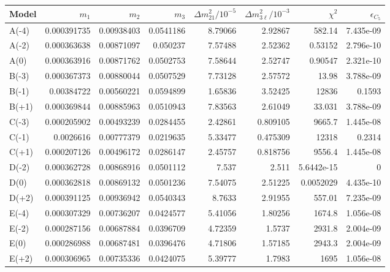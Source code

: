 \begin{tabular}{lrrrrrrr}
\hline
Model & $m_1$ & $m_2$ & $m_3$ & $\Delta m^2_{21}/10^{-5}$ & $\Delta m^2_{3\ell}/10^{-3}$ & $\chi^2$ & $\epsilon_{C_5}$ \\
\hline
A(-4) & 0.000391735 & 0.00938403 & 0.0541186 & 8.79066 & 2.92867 & 582.14 & 7.435e-09 \\
A(-2) & 0.000363638 & 0.00871097 & 0.050237 & 7.57488 & 2.52362 & 0.53152 & 2.796e-10 \\
A(0) & 0.000363916 & 0.00871762 & 0.0502753 & 7.58644 & 2.52747 & 0.90547 & 2.321e-10 \\
B(-3) & 0.000367373 & 0.00880044 & 0.0507529 & 7.73128 & 2.57572 & 13.98 & 3.788e-09 \\
B(-1) & 0.00384722 & 0.00560221 & 0.0594899 & 1.65836 & 3.52425 & 12836 & 0.1593 \\
B(+1) & 0.000369844 & 0.00885963 & 0.0510943 & 7.83563 & 2.61049 & 33.031 & 3.788e-09 \\
C(-3) & 0.000205902 & 0.00493239 & 0.0284455 & 2.42861 & 0.809105 & 9665.7 & 1.445e-08 \\
C(-1) & 0.0026616 & 0.00777379 & 0.0219635 & 5.33477 & 0.475309 & 12318 & 0.2314 \\
C(+1) & 0.000207126 & 0.00496172 & 0.0286147 & 2.45757 & 0.818756 & 9556.4 & 1.445e-08 \\
D(-2) & 0.000362728 & 0.00868916 & 0.0501112 & 7.537 & 2.511 & 5.6442e-15 & 0 \\
D(0) & 0.000362818 & 0.00869132 & 0.0501236 & 7.54075 & 2.51225 & 0.0052029 & 4.435e-10 \\
D(+2) & 0.000391125 & 0.00936942 & 0.0540343 & 8.7633 & 2.91955 & 557.01 & 7.235e-09 \\
E(-4) & 0.000307329 & 0.00736207 & 0.0424577 & 5.41056 & 1.80256 & 1674.8 & 1.056e-08 \\
E(-2) & 0.000287156 & 0.00687884 & 0.0396709 & 4.72359 & 1.5737 & 2931.8 & 2.004e-09 \\
E(0) & 0.000286988 & 0.00687481 & 0.0396476 & 4.71806 & 1.57185 & 2943.3 & 2.004e-09 \\
E(+2) & 0.000306965 & 0.00735336 & 0.0424075 & 5.39777 & 1.7983 & 1695 & 1.056e-08 \\
\hline
\end{tabular}
